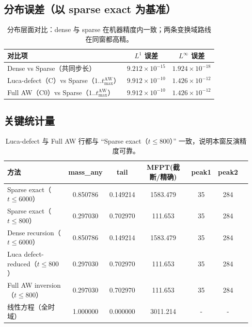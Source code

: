 \documentclass[11pt,a4paper]{ctexart}
\begin{document}
\subsection{分布误差（以 sparse exact 为基准）}
\begin{table}[H]
  \centering
  \begin{tabular}{lcc}
    \toprule
    对比项 & $L^1$ 误差 & $L^\infty$ 误差 \\
    \midrule
    Dense vs Sparse（共同步长） & $9.212\times 10^{-15}$ & $1.924\times 10^{-18}$ \\
    Luca-defect（C）vs Sparse（$1..t_{\max}^{\mathrm{AW}}$） & $9.912\times 10^{-10}$ & $1.426\times 10^{-12}$ \\
    Full AW（C0）vs Sparse（$1..t_{\max}^{\mathrm{AW}}$） & $9.912\times 10^{-10}$ & $1.426\times 10^{-12}$ \\
    \bottomrule
  \end{tabular}
  \caption{分布层面对比：dense 与 sparse 在机器精度内一致；两条变换域路线在同窗都高精。}
\end{table}

\subsection{关键统计量}
\begin{table}[H]
  \centering
  \small
  \begin{tabular}{lcccccc}
    \toprule
    方法 & mass\_any & tail & MFPT(截断/精确) & peak1 & peak2 \\
    \midrule
    Sparse exact（$t\le 6000$） & 0.850786 & 0.149214 & 1583.479 & 35 & 284 \\
    Sparse exact（$t\le 800$） & 0.297030 & 0.702970 & 111.653 & 35 & 284 \\
    Dense recursion（$t\le 6000$） & 0.850786 & 0.149214 & 1583.479 & 35 & 284 \\
    Luca defect-reduced（$t\le 800$） & 0.297030 & 0.702970 & 111.653 & 35 & 284 \\
    Full AW inversion（$t\le 800$） & 0.297030 & 0.702970 & 111.653 & 35 & 284 \\
    线性方程（全时域） & 1.000000 & 0.000000 & 3011.214 & - & - \\
    \bottomrule
  \end{tabular}
  \caption{Luca-defect 与 Full AW 行都与 ``Sparse exact（$t\le800$）'' 一致，说明本窗反演精度可靠。}
\end{table}
\end{document}
